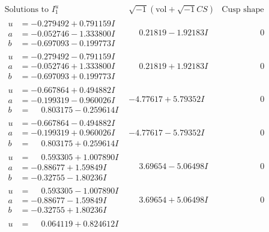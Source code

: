 \documentclass[1p]{elsarticle_modified}
\theoremstyle{definition}
\newcommand{\I}{\sqrt{-1}}
\begin{document}
$$\begin{array}{c|c|c}
\text{Solutions to }I^u_{1}& \I (\text{vol} + \sqrt{-1}CS) & \text{Cusp shape}\\
 \hline 
\begin{aligned}
u &= -0.279492 + 0.791159 I \\
a &= -0.052746 - 1.333800 I \\
b &= -0.697093 - 0.199773 I\end{aligned}
 & \phantom{-}0.21819 - 1.92183 I & \phantom{-0.000000 } 0 \\ \hline\begin{aligned}
u &= -0.279492 - 0.791159 I \\
a &= -0.052746 + 1.333800 I \\
b &= -0.697093 + 0.199773 I\end{aligned}
 & \phantom{-}0.21819 + 1.92183 I & \phantom{-0.000000 } 0 \\ \hline\begin{aligned}
u &= -0.667864 + 0.494882 I \\
a &= -0.199319 - 0.960026 I \\
b &= \phantom{-}0.803175 - 0.259614 I\end{aligned}
 & -4.77617 + 5.79352 I & \phantom{-0.000000 } 0 \\ \hline\begin{aligned}
u &= -0.667864 - 0.494882 I \\
a &= -0.199319 + 0.960026 I \\
b &= \phantom{-}0.803175 + 0.259614 I\end{aligned}
 & -4.77617 - 5.79352 I & \phantom{-0.000000 } 0 \\ \hline\begin{aligned}
u &= \phantom{-}0.593305 + 1.007890 I \\
a &= -0.88677 + 1.59849 I \\
b &= -0.32755 - 1.80236 I\end{aligned}
 & \phantom{-}3.69654 - 5.06498 I & \phantom{-0.000000 } 0 \\ \hline\begin{aligned}
u &= \phantom{-}0.593305 - 1.007890 I \\
a &= -0.88677 - 1.59849 I \\
b &= -0.32755 + 1.80236 I\end{aligned}
 & \phantom{-}3.69654 + 5.06498 I & \phantom{-0.000000 } 0 \\ \hline\begin{aligned}
u &= \phantom{-}0.064119 + 0.824612 I \\

\end{aligned}
\end{array}$$
\end{document}

